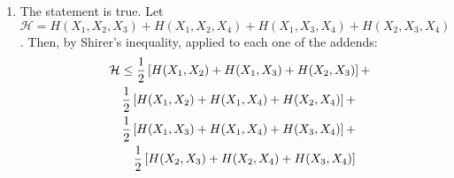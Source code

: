 \documentclass[11pt]{article} \usepackage{amssymb}
\newtheorem*{theorem*}{Theorem}
\newtheorem*{lemma*}{Lemma}
\begin{document}
\begin{enumerate}
Let $X=(X_1,\ldots,X_n)\in S$ be picked from the uniform distribution over
$S$.
\begin{lemma*}
  $H(X_i|X_1,\ldots,X_{i-1},X_{i+1},\ldots,X_n)\geq {\log 3|E_i|\over|S|}$
\end{lemma*}
\begin{proof}
Assume w.l.o.g that $i=1$. Then let $K_1$ be the number of values 
of $X_2,\ldots,X_n$ for which there is only one possible value of $X_1$,
and likewise define $K_2$ and $K_3$. Then $|S|=K_1+2K_2+3K_3$ and
 $|E_1|=K_2+3K_3$. The entropy of
$X_1$ is:
\begin{eqnarray*}
  H(X_1)&=&{K_1\over |S|}\cdot 0 +{2K_2\over|S|}\log 2 + {3K_3\over |S|}\log 3\\
&=& {\log 3\over|S|}\left({2\over \log 3}K_2+3K_3\right)\\ 
&\geq& {\log 3|E_1|\over|S|}
\end{eqnarray*}
\end{proof}
\begin{theorem*}
  $|E|\leq |S|\log|S|$
\end{theorem*}
\begin{proof}
  \begin{eqnarray*}
    \log|S|&=&H(X_1,\ldots,X_n)\\
    &\geq& H(X_1)+H(X_2|X_1)+H(X_3|X_1,X_2)+\cdots+H(X_n|X_1,\ldots,X_{n-1})\\
    &\geq& H(X_1|X_2,\ldots,X_n)+H(X_2|X_1,X_3,\ldots,X_n)+\cdots+H(X_n|X_1,\ldots,X_{n-1})\\
    &\geq& {\log3|E_1|\over|S|}+\cdots+{\log3|E_n|\over|S|}\\
    &=&{\log3|E|\over|S|}
  \end{eqnarray*}
and hence
\begin{equation*}
  |E|\leq{1\over \log 3}|S|\log|S|
\end{equation*}
\end{proof}
\item
The statement is true.
Let $\mathcal{H}= H(X_1,X_2,X_3)+H(X_1,X_2,X_4)+H(X_1,X_3,X_4)+H(X_2,X_3,X_4)$.
Then, by Shirer's inequality, applied to each one of the addends:
  \begin{eqnarray*}
\lefteqn{\mathcal{H}\leq
  {1\over 2}\left[H(X_1,X_2)+H(X_1,X_3)+H(X_2,X_3)\right]+}\\
&&{1\over 2}\left[H(X_1,X_2)+H(X_1,X_4)+H(X_2,X_4)\right]+\\
&&{1\over 2}\left[H(X_1,X_3)+H(X_1,X_4)+H(X_3,X_4)\right]+\\
&&{1\over 2}\left[H(X_2,X_3)+H(X_2,X_4)+H(X_3,X_4)\right]\\

\end{eqnarray*}
\end{enumerate}
\end{document}
